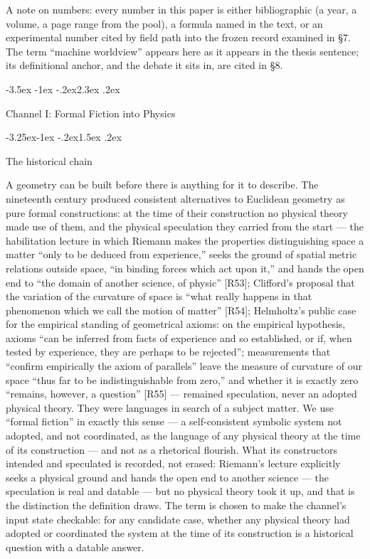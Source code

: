 \documentclass[11pt,a4paper]{article}
\makeatletter
\renewcommand\section{\@startsection{section}{1}{\z@}%
  {-3.5ex \@plus -1ex \@minus -.2ex}{2.3ex \@plus .2ex}%
  {\normalfont\Large\bfseries\raggedright}}
\renewcommand\subsection{\@startsection{subsection}{2}{\z@}%
  {-3.25ex\@plus -1ex \@minus -.2ex}{1.5ex \@plus .2ex}%
  {\normalfont\large\bfseries\raggedright}}
\makeatother
\begin{document}
A note on numbers: every number in this paper is either bibliographic (a year, a volume, a page range from the pool), a formula named in the text, or an experimental number cited by field path into the frozen record examined in §7. The term ``machine worldview'' appears here as it appears in the thesis sentence; its definitional anchor, and the debate it sits in, are cited in §8.

\section{Channel I: Formal Fiction into Physics}

\subsection{The historical chain}

A geometry can be built before there is anything for it to describe. The nineteenth century produced consistent alternatives to Euclidean geometry as pure formal constructions: at the time of their construction no physical theory made use of them, and the physical speculation they carried from the start — the habilitation lecture in which Riemann makes the properties distinguishing space a matter ``only to be deduced from experience,'' seeks the ground of spatial metric relations outside space, ``in binding forces which act upon it,'' and hands the open end to ``the domain of another science, of physic'' [R53]; Clifford's proposal that the variation of the curvature of space is ``what really happens in that phenomenon which we call the motion of matter'' [R54]; Helmholtz's public case for the empirical standing of geometrical axioms: on the empirical hypothesis, axioms ``can be inferred from facts of experience and so established, or if, when tested by experience, they are perhaps to be rejected''; measurements that ``confirm empirically the axiom of parallels'' leave the measure of curvature of our space ``thus far to be indistinguishable from zero,'' and whether it is exactly zero ``remains, however, a question'' [R55] — remained speculation, never an adopted physical theory. They were languages in search of a subject matter. We use ``formal fiction'' in exactly this sense — a self-consistent symbolic system not adopted, and not coordinated, as the language of any physical theory at the time of its construction — and not as a rhetorical flourish. What its constructors intended and speculated is recorded, not erased: Riemann's lecture explicitly seeks a physical ground and hands the open end to another science — the speculation is real and datable — but no physical theory took it up, and that is the distinction the definition draws. The term is chosen to make the channel's input state checkable: for any candidate case, whether any physical theory had adopted or coordinated the system at the time of its construction is a historical question with a datable answer.
\end{document}
